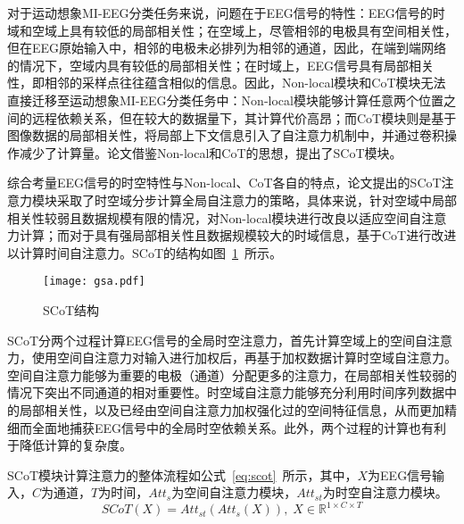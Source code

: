 对于运动想象MI-EEG分类任务来说，问题在于EEG信号的特性：EEG信号的时域和空域上具有较低的局部相关性；在空域上，尽管相邻的电极具有空间相关性，但在EEG原始输入中，相邻的电极未必排列为相邻的通道，因此，在端到端网络的情况下，空域内具有较低的局部相关性；在时域上，EEG信号具有局部相关性，即相邻的采样点往往蕴含相似的信息。因此，Non-local模块和CoT模块无法直接迁移至运动想象MI-EEG分类任务中：Non-local模块能够计算任意两个位置之间的远程依赖关系，但在较大的数据量下，其计算代价高昂；而CoT模块则是基于图像数据的局部相关性，将局部上下文信息引入了自注意力机制中，并通过卷积操作减少了计算量。论文借鉴Non-local和CoT的思想，提出了SCoT模块。

综合考量EEG信号的时空特性与Non-local、CoT各自的特点，论文提出的SCoT注意力模块采取了时空域分步计算全局自注意力的策略，具体来说，针对空域中局部相关性较弱且数据规模有限的情况，对Non-local模块进行改良以适应空间自注意力计算；而对于具有强局部相关性且数据规模较大的时域信息，基于CoT进行改进以计算时间自注意力。SCoT的结构如图~\ref{fig:gsa}~所示。
\begin{figure}
    \centering
    \texttt{[image: gsa.pdf]}
    \caption{SCoT结构}
    \label{fig:gsa}
\end{figure}

SCoT分两个过程计算EEG信号的全局时空注意力，首先计算空域上的空间自注意力，使用空间自注意力对输入进行加权后，再基于加权数据计算时空域自注意力。空间自注意力能够为重要的电极（通道）分配更多的注意力，在局部相关性较弱的情况下突出不同通道的相对重要性。时空域自注意力能够充分利用时间序列数据中的局部相关性，以及已经由空间自注意力加权强化过的空间特征信息，从而更加精细而全面地捕获EEG信号中的全局时空依赖关系。此外，两个过程的计算也有利于降低计算的复杂度。

SCoT模块计算注意力的整体流程如公式~\ref{eq:scot}~所示，其中，\(X\)为EEG信号输入，\(C\)为通道，\(T\)为时间，\(Att_s\)为空间自注意力模块，\(Att_{st}\)为时空自注意力模块。
\begin{equation}
    SCoT(X)=Att_{st}(Att_s(X)), \; X \in \mathbb{R}^{1 \times C \times T}
    \label{eq:scot}
\end{equation}

